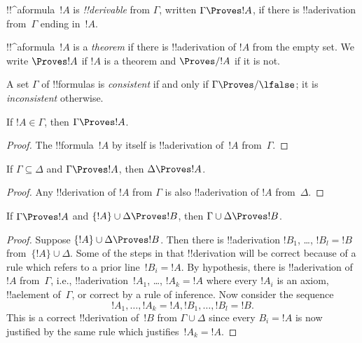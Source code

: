 \begin{defn}[!!^{derivability}]
!!^a{formula}~$!A$ is \emph{!!{derivable}} from $\Gamma$, written
$\Gamma \Proves !A$, if there is !!a{derivation} from~$\Gamma$ ending
in~$!A$.
\end{defn}

\begin{defn}[Theorems]
!!^a{formula}~$!A$ is a \emph{theorem} if there is !!a{derivation} of
$!A$ from the empty set.  We write $\Proves !A$ if $!A$ is a theorem
and $\Proves/ !A$ if it is not.
\end{defn}

\begin{defn}[Consistency]
A set $\Gamma$ of !!{formula}s is \emph{consistent} if and only if
$\Gamma\Proves/ \lfalse$; it is \emph{inconsistent} otherwise.
\end{defn}

\begin{prop}[Reflexivity]
If $!A \in \Gamma$, then $\Gamma \Proves !A$.
\end{prop}

\begin{proof}
  The !!{formula}~$!A$ by itself is !!a{derivation} of~$!A$ from~$\Gamma$.
\end{proof}

\begin{prop}[Monotonicity]
If $\Gamma \subseteq \Delta$ and $\Gamma \Proves !A$, then $\Delta
\Proves !A$.
\end{prop}

\begin{proof}
Any !!{derivation} of $!A$ from $\Gamma$ is also !!a{derivation} of
$!A$ from~$\Delta$.
\end{proof}

\begin{prop}[Transitivity]
If $\Gamma \Proves !A$ and $\{!A\} \cup \Delta \Proves
!B$, then $\Gamma \cup \Delta \Proves !B$.
\end{prop}

\begin{proof}
  Suppose $\{!A\} \cup \Delta \Proves !B$. Then there is
  !!a{derivation} $!B_1$, \dots, $!B_l = !B$ from~$\{!A\} \cup
  \Delta$. Some of the steps in that !!{derivation} will be correct
  because of a rule which refers to a prior line~$!B_i = !A$. By
  hypothesis, there is !!a{derivation} of~$!A$ from~$\Gamma$, i.e.,
  !!a{derivation}~$!A_1$, \dots, $!A_k = !A$ where every $!A_i$ is an
  axiom, !!a{element} of~$\Gamma$, or correct by a rule of
  inference. Now consider the sequence
  \[
  !A_1, \dots, !A_k = !A, !B_1, \dots, !B_l = !B.
  \]
  This is a correct !!{derivation} of~$!B$ from $\Gamma \cup \Delta$
  since every $B_i = !A$ is now justified by the same rule which
  justifies~$!A_k = !A$.
\end{proof}

